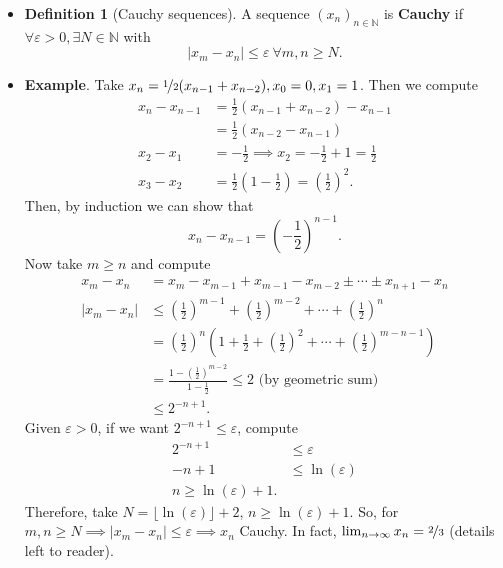 \documentclass{article}
\newcommand{\N}{\mathbb{N}}
\newcommand{\seq}[2]{(#1_{#2})_{#2 \in \N}}
\newcommand{\?}{\stackrel{?}{=}}
\theoremstyle{definition} %
\newtheorem{definition}[subsection]{Definition} %
\begin{document}
\begin{itemize}
    \item[] 
    \begin{definition}[Cauchy sequences]
        A sequence $\seq{x}{n}$ is \textbf{Cauchy} if $\forall \varepsilon > 0, \exists N \in \N$ with
    $$|x_m - x_n| \leq \varepsilon \ \forall m, n \geq N.$$
    \end{definition}
    \item \textbf{Example}. Take $x_n = \nicefrac{1}{2}(x_{n - 1} + x_{n - 2}), x_0 = 0, x_1 = 1$. Then we compute
    \begin{align*}
        x_n - x_{n - 1} &= \frac{1}{2}(x_{n - 1} + x_{n - 2}) - x_{n - 1} \\
        &= \frac{1}{2}(x_{n - 2} - x_{n - 1}) \\
        x_2 - x_1 &= -\frac{1}{2} \implies x_2 = -\frac{1}{2} + 1 = \frac{1}{2} \\
        x_3 - x_2 &= \frac{1}{2}(1 - \frac{1}{2}) = \left(\frac{1}{2}\right)^2.
    \end{align*}
    Then, by induction we can show that
    $$x_n - x_{n - 1} = \left(-\frac{1}{2}\right)^{n - 1}.$$
    Now take $m \geq n$ and compute
    \begin{align*}
        x_m - x_n &= x_m - x_{m - 1} + x_{m - 1} - x_{m - 2} \pm \cdots \pm x_{n + 1} - x_n \\
        |x_m - x_n| &\leq \left(\frac{1}{2}\right)^{m - 1} + \left(\frac{1}{2}\right)^{m - 2} + \cdots + \left(\frac{1}{2}\right)^n \\
        &= \left(\frac{1}{2}\right)^n\left(1 + \frac{1}{2} + \left(\frac{1}{2}\right)^2 + \cdots + \left(\frac{1}{2}\right)^{m - n - 1}\right) \\
        &= \frac{1 - \left(\frac{1}{2}\right)^{m - 2}}{1 - \frac{1}{2}} \leq 2 \text{ (by geometric sum)} \\
        &\leq 2^{-n + 1}.
    \end{align*}
    Given $\varepsilon > 0$, if we want $2^{-n + 1} \leq \varepsilon$, compute
    \begin{align*}
        2^{-n + 1} &\leq \varepsilon \\
        -n + 1 &\leq \ln(\varepsilon) \\
        n \geq \ln(\varepsilon) + 1.
    \end{align*}
    Therefore, take $N = \lfloor \ln(\varepsilon) \rfloor + 2$, $n \geq \ln(\varepsilon) + 1$. So, for $m, n \geq N \implies |x_m - x_n| \leq \varepsilon \implies x_n$ Cauchy. In fact, $\lim_{n \to \infty} x_n = \nicefrac{2}{3}$ (details left to reader). \\\\

\end{itemize}
\end{document}
